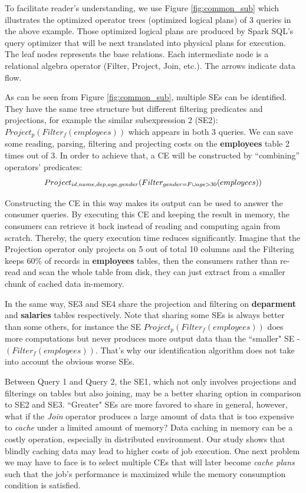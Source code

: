 To facilitate reader's understanding, we use Figure \ref{fig:common_sub} which illustrates the optimized operator trees (optimized logical plans) of 3 queries in the above example. Those optimized logical plans are produced by Spark SQL's query optimizer that will be next translated into physical plans for execution. The leaf nodes represents the base relations. Each intermediate node is a relational algebra operator (Filter, Project, Join, etc.). The arrows indicate data flow.

As can be seen from Figure \ref{fig:common_sub}, multiple SEs can be identified. They have the same tree structure but different filtering predicates and projections, for example the similar subexpression 2 (SE2): $Project_p(Filter_f(employees))$ which appears in both 3 queries. We can save some reading, parsing, filtering and projecting costs on the \textbf{employees} table 2 times out of 3. In order to achieve that, a CE will be constructed by ``combining'' operators' predicates: 
\[\Scale[0.95]{Project_{id, name, dep, age, gender}(Filter_{gender=F \cup age>30}(employees))}\]

Constructing the CE in this way makes its output can be used to answer the consumer queries. By executing this CE and keeping the result in memory, the consumers can retrieve it back instead of reading and computing again from scratch. Thereby, the query execution time reduces significantly. Imagine that the Projection operator only projects on 5 out of total 10 columns and the Filtering keeps 60\% of records in \textbf{employees} tables, then the consumers rather than re-read and scan the whole table from disk, they can just extract from a smaller chunk of cached data in-memory. 

In the same way, SE3 and SE4 share the projection and filtering on \textbf{deparment} and  \textbf{salaries} tables respectively. Note that sharing some SEs is always better than some others, for instance the SE $Project_p(Filter_f(employees))$ does more computations but never produces more output data than the ``smaller" SE - $(Filter_f(employees))$. That's why our identification algorithm does not take into account the obvious worse SEs.

Between Query 1 and Query 2, the SE1, which not only involves projections and filterings on tables but also joining, may be a better sharing option in comparison to SE2 and SE3. ``Greater" SEs are more favored to share in general, however, what if the \emph{Join} operator produces a large amount of data that is too expensive to \emph{cache} under a limited amount of memory? Data caching in memory can be a costly operation, especially in distributed environment. Our study shows that blindly caching data may lead to higher costs of job execution. One next problem we may have to face is to select multiple CEs that will later become \emph{cache plans} such that the job's performance is maximized while the memory consumption condition is satisfied.

